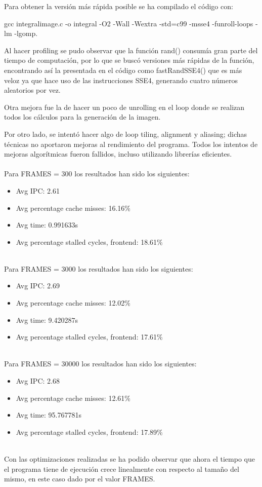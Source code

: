\documentclass[a4paper,10pt]{article}
\begin{document}
Para obtener la versión más rápida posible se ha compilado el código con:

gcc integralimage.c -o integral -O2 -Wall -Wextra -std=c99 -msse4 -funroll-loops -lm -lgomp.

Al hacer profiling se pudo observar que la función rand() consumía gran parte del tiempo de computación, por
lo que se buscó versiones más rápidas de la función, encontrando así la presentada en el código como
fastRandSSE4() que es más veloz ya que hace uso de las instrucciones SSE4, generando cuatro números
aleatorios por vez.

Otra mejora fue la de hacer un poco de unrolling en el loop donde se realizan todos los cálculos
para la generación de la imagen. 

Por otro lado, se intentó hacer algo de loop tiling, alignment y  aliasing; dichas técnicas no aportaron 
mejoras al rendimiento del programa. Todos los intentos de mejoras algorítmicas fueron fallidos, incluso
utilizando librerías eficientes.
\\
\\
Para FRAMES = 300 los resultados han sido los siguientes:
\begin{itemize}
  \item Avg IPC: 2.61
  \item Avg percentage cache misses: 16.16\%
  \item Avg time: 0.991633s 
  \item Avg percentage stalled cycles, frontend: 18.61\%
\end{itemize}
\\
Para FRAMES = 3000 los resultados han sido los siguientes:
\begin{itemize}
  \item Avg IPC: 2.69
  \item Avg percentage cache misses: 12.02\%
  \item Avg time: 9.420287s 
  \item Avg percentage stalled cycles, frontend: 17.61\%
\end{itemize}
\\
Para FRAMES = 30000 los resultados han sido los siguientes:
\begin{itemize}
  \item Avg IPC: 2.68
  \item Avg percentage cache misses: 12.61\%
  \item Avg time: 95.767781s 
  \item Avg percentage stalled cycles, frontend: 17.89\%
\end{itemize}

\\
Con las optimizaciones realizadas se ha podido observar que ahora el tiempo que el programa tiene
de ejecución crece linealmente con respecto al tamaño del mismo, en este caso dado por el valor
FRAMES.  
\end{document}
